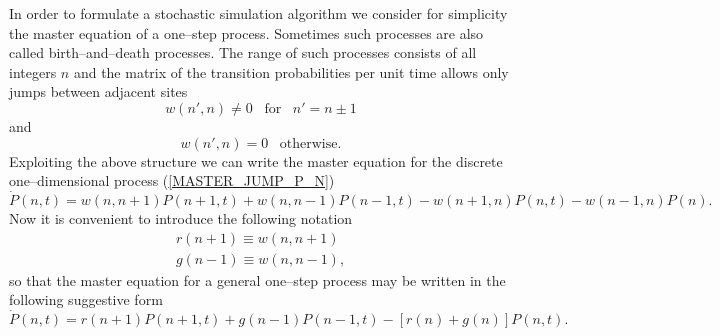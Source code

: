 In order to formulate a stochastic simulation algorithm we 
consider for simplicity the master equation of a one--step 
process. Sometimes such processes are also called birth--and--death
processes. The range of such processes consists of all integers
$n$ and the matrix of the transition probabilities per unit time
allows only jumps between adjacent sites
\begin{equation*}
w(n',n) \neq 0 \;\;\; \text{for} \;\;\; n'=n \pm 1
\end{equation*}
and
\begin{equation*}
w(n',n) = 0 \;\;\; \text{otherwise}.
\end{equation*}
Exploiting the above structure we can write the master equation 
for the discrete one--dimensional process (\ref{MASTER_JUMP_P_N})
\begin{equation*}
\dot{P}(n,t) = w(n,n+1)P(n+1,t) + w(n,n-1)P(n-1,t)
        -w(n+1,n)P(n,t) -w(n-1,n)P(n).
\end{equation*}
Now it is convenient to introduce the following notation
\begin{eqnarray*}
r(n+1) \equiv w(n,n+1) \\
g(n-1) \equiv w(n,n-1),
\end{eqnarray*}
so that the master equation for a general one--step process 
may be written in the following 
suggestive form
\begin{equation}
\label{MASTER_ONE_STEP}
\dot{P}(n,t) = r(n+1)P(n+1,t) + g(n-1)P(n-1,t)
        -[r(n)+ g(n)]P(n,t).
\end{equation}

